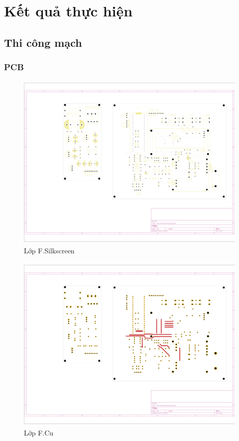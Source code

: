 \fontsize{13}{14}\selectfont
\chapter{Kết quả thực hiện}
\newpage
\section{Thi công mạch}
\subsection{PCB}
	\begin{figure}[H]
		\centering
		\includegraphics[width=0.8\linewidth]{./picture/layout_Fs.pdf}
		\caption{Lớp F.Silkscreen}
		\label{FSilkscreen}
	\end{figure}
	
	\begin{figure}[H]
		\centering
		\includegraphics[width=0.8\linewidth]{./picture/layout_F.pdf}
		\caption{Lớp F.Cu}
		\label{Flayer}
	\end{figure}
	
